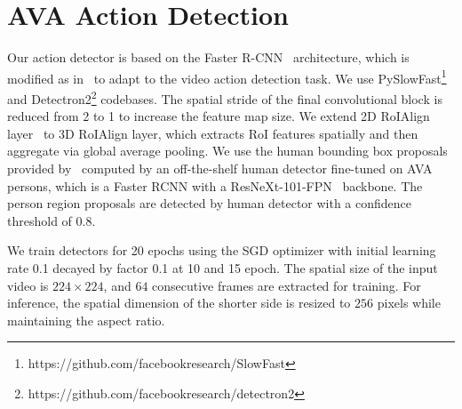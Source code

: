 \section{AVA Action Detection}
\label{appendix:ava}

Our action detector is based on the Faster R-CNN~\cite{ren2015faster} architecture, which is modified as in~\cite{feichtenhofer2019slowfast} to adapt to the video action detection task. 
We use PySlowFast\footnote{https://github.com/facebookresearch/SlowFast} and Detectron2\footnote{https://github.com/facebookresearch/detectron2} codebases.
The spatial stride of the final convolutional block is reduced from 2 to 1
to increase the feature map size.
We extend 2D RoIAlign layer~\cite{he2017mask} to 3D RoIAlign layer, which extracts RoI features spatially and then aggregate via global average pooling. 
We use the human bounding box proposals provided by~\cite{feichtenhofer2019slowfast} computed by an off-the-shelf human detector fine-tuned on AVA persons, which is a Faster RCNN with a ResNeXt-101-FPN~\cite{xie2017resnext} backbone.
The person region proposals are detected by human detector with a confidence threshold of $0.8$.

We train detectors for 20 epochs using the SGD optimizer with initial learning rate 0.1 decayed by factor 0.1 at 10 and 15 epoch. 
The spatial size of the input video is $224\times224$, and $64$ consecutive frames are extracted for training.
For inference, the spatial dimension of the shorter side is resized to $256$ pixels while maintaining the aspect ratio. 
